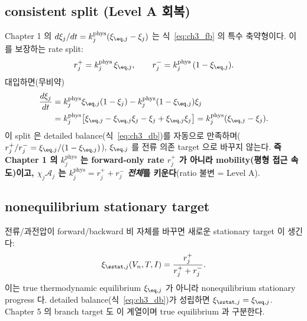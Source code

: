\subsection{consistent split (Level A 회복)}
Chapter 1 의 $d\xi_j/dt=k_j^{\mathrm{phys}}(\xi_{\eq,j}-\xi_j)$ 는 식~\eqref{eq:ch3_fb} 의 특수 축약형이다.
이를 보장하는 rate split:
\begin{equation}
r_j^+=k_j^{\mathrm{phys}}\,\xi_{\eq,j},\qquad r_j^-=k_j^{\mathrm{phys}}\,(1-\xi_{\eq,j}).
\label{eq:ch3_split}
\end{equation}
대입하면(무비약)
\begin{align}
\frac{d\xi_j}{dt}
&=k_j^{\mathrm{phys}}\xi_{\eq,j}(1-\xi_j)-k_j^{\mathrm{phys}}(1-\xi_{\eq,j})\xi_j \notag\\
&=k_j^{\mathrm{phys}}\big[\xi_{\eq,j}-\xi_{\eq,j}\xi_j-\xi_j+\xi_{\eq,j}\xi_j\big]
=k_j^{\mathrm{phys}}(\xi_{\eq,j}-\xi_j).
\label{eq:ch3_recover}
\end{align}
이 split 은 detailed balance(식~\eqref{eq:ch3_db})를 자동으로 만족하며($r_j^+/r_j^-=\xi_{\eq,j}/(1-\xi_{\eq,j})$),
$\xi_{\eq,j}$ 를 전류 의존 target 으로 바꾸지 않는다. \textbf{즉 Chapter 1 의 $k_j^{\mathrm{phys}}$ 는 forward-only
rate $r_j^+$ 가 아니라 mobility(평형 접근 속도)이고, $\chi_j\mathcal A_j$ 는 $k_j^{\mathrm{phys}}=r_j^++r_j^-$
\emph{전체}를 키운다}(ratio 불변 = Level A).

\subsection{nonequilibrium stationary target}
전류/과전압이 forward/backward 비 자체를 바꾸면 새로운 stationary target 이 생긴다:
\begin{equation}
\xi_{\sstat,j}(V_n,T,I)=\frac{r_j^+}{r_j^++r_j^-}.
\label{eq:ch3_xiss}
\end{equation}
이는 true thermodynamic equilibrium $\xi_{\eq,j}$ 가 아니라 nonequilibrium stationary progress 다.
detailed balance(식~\eqref{eq:ch3_db})가 성립하면 $\xi_{\sstat,j}=\xi_{\eq,j}$. Chapter 5 의 branch target 도
이 계열이며 true equilibrium 과 구분한다.

